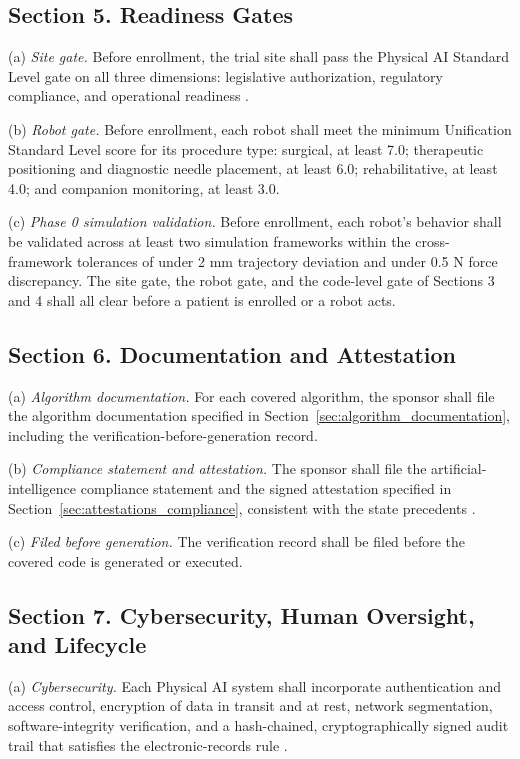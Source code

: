 \subsection{Section 5. Readiness Gates}

(a) \textit{Site gate.} Before enrollment, the trial site shall pass the Physical
AI Standard Level gate on all three dimensions: legislative authorization,
regulatory compliance, and operational readiness \cite{kawchak2026national}.

(b) \textit{Robot gate.} Before enrollment, each robot shall meet the minimum
Unification Standard Level score for its procedure type: surgical, at least 7.0;
therapeutic positioning and diagnostic needle placement, at least 6.0;
rehabilitative, at least 4.0; and companion monitoring, at least 3.0.

(c) \textit{Phase 0 simulation validation.} Before enrollment, each robot's
behavior shall be validated across at least two simulation frameworks within the
cross-framework tolerances of under 2 mm trajectory deviation and under 0.5 N
force discrepancy. The site gate, the robot gate, and the code-level gate of
Sections 3 and 4 shall all clear before a patient is enrolled or a robot acts.

\subsection{Section 6. Documentation and Attestation}

(a) \textit{Algorithm documentation.} For each covered algorithm, the sponsor
shall file the algorithm documentation specified in
Section~\ref{sec:algorithm_documentation}, including the
verification-before-generation record.

(b) \textit{Compliance statement and attestation.} The sponsor shall file the
artificial-intelligence compliance statement and the signed attestation specified
in Section~\ref{sec:attestations_compliance}, consistent with the state
precedents \cite{tx-sb1822, ny-a9149, ca-sb1120}.

(c) \textit{Filed before generation.} The verification record shall be filed
before the covered code is generated or executed.

\subsection{Section 7. Cybersecurity, Human Oversight, and Lifecycle}

(a) \textit{Cybersecurity.} Each Physical AI system shall incorporate
authentication and access control, encryption of data in transit and at rest,
network segmentation, software-integrity verification, and a hash-chained,
cryptographically signed audit trail that satisfies the electronic-records rule
\cite{cfr-part11, kawchak2026mcp}.

